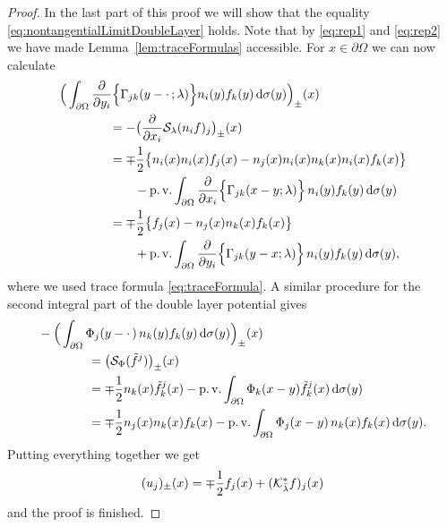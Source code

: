 \begin{proof}
  In the last part of this proof we will show that the equality \eqref{eq:nontangentialLimitDoubleLayer} holds.
  Note that by \eqref{eq:rep1} and \eqref{eq:rep2} we have made Lemma~\ref{lem:traceFormulas} accessible.
  For $x \in \partial\Omega$ we can now calculate
  \begin{align*}
    &\Big( \int_{\partial\Omega} \frac{\partial}{\partial y_i} \Big\{ \Gamma_{jk}(y - \cdot\, ; \lambda) \Big\} n_i(y) f_k(y) \, {\operatorname{d}\!{\sigma}}(y) \Big)_\pm(x)\\
    &\qquad\qquad= - \big( \frac{\partial}{\partial x_i} \mathcal{S}_\lambda(n_i f)_j\big)_\pm(x) \\
    &\qquad\qquad= \mp \frac{1}{2} \big\{ n_i(x) n_i(x) f_j(x) - n_j(x) n_i(x) n_k(x) n_i(x) f_k(x)  \big\} \\
    &\qquad\qquad\qquad - \operatorname{p. v.}\int_{\partial\Omega} \frac{\partial}{\partial x_i} \Big\{\Gamma_{jk}(x - y; \lambda) \Big\} \, n_i(y) f_k(y) \, {\operatorname{d}\!{\sigma}}(y) \\
    &\qquad\qquad= \mp \frac{1}{2} \big\{ f_j(x) - n_j(x) n_k(x) f_k(x) \big\} \\
    &\qquad\qquad\qquad + \operatorname{p. v.}\int_{\partial\Omega} \frac{\partial}{\partial y_i} \Big\{\Gamma_{jk}(y - x; \lambda) \Big\}\,  n_i(y) f_k(y) \, {\operatorname{d}\!{\sigma}}(y),
  \end{align*}
  where we used trace formula \eqref{eq:traceFormula}.
  A similar procedure for the second integral part of the double layer potential gives
  \begin{align*}
    &-\Big(\int_{\partial\Omega} \Phi_j(y - \cdot\,) \, n_k(y) f_k(y) \, {\operatorname{d}\!{\sigma}}(y)\Big)_\pm(x) \\
    &\qquad\qquad= \big(\mathcal{S}_\Phi(\tilde f^j)\big)_\pm(x)  \\
    &\qquad\qquad= \mp \frac{1}{2} n_k(x) \tilde f^j_k(x) - \operatorname{p. v.} \int_{\partial\Omega} \Phi_k(x - y) \tilde f^j_k(x) \, {\operatorname{d}\!{\sigma}}(y) \\
    &\qquad\qquad= \mp \frac{1}{2} n_j(x) n_k(x) f_k(x) - \operatorname{p. v.} \int_{\partial\Omega} \Phi_j(x - y)\, n_k(x) f_k(x) \, {\operatorname{d}\!{\sigma}}(y).
  \end{align*}
  Putting everything together we get
  \begin{align*}
    (u_j)_\pm(x) = \mp\frac{1}{2} f_j(x) + (\mathcal{K}_{\bar\lambda}^* f)_j(x)
  \end{align*}
  and the proof is finished.
\end{proof}
